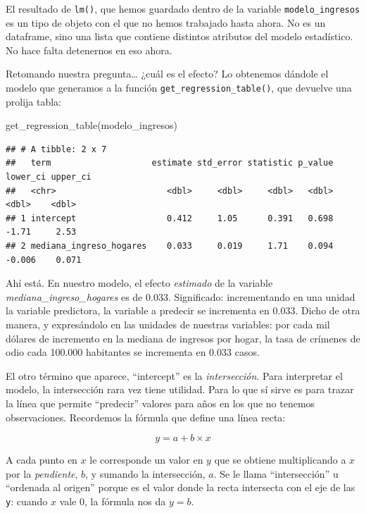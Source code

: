 \documentclass[
]{book}
\newenvironment{Shaded}{\begin{snugshade}}{\end{snugshade}}
\newcommand{\FunctionTok}[1]{\textcolor[rgb]{0.00,0.00,0.00}{#1}}
\newcommand{\NormalTok}[1]{#1}
\begin{document}
El resultado de \texttt{lm()}, que hemos guardado dentro de la variable \texttt{modelo\_ingresos} es un tipo de objeto con el que no hemos trabajado hasta ahora. No es un dataframe, sino una lista que contiene distintos atributos del modelo estadístico. No hace falta detenernos en eso ahora.

Retomando nuestra pregunta\ldots{} ¿cuál es el efecto? Lo obtenemos dándole el modelo que generamos a la función \texttt{get\_regression\_table()}, que devuelve una prolija tabla:

\begin{Shaded}
\begin{Highlighting}[]
\FunctionTok{get\_regression\_table}\NormalTok{(modelo\_ingresos)}
\end{Highlighting}
\end{Shaded}

\begin{verbatim}
## # A tibble: 2 x 7
##   term                    estimate std_error statistic p_value lower_ci upper_ci
##   <chr>                      <dbl>     <dbl>     <dbl>   <dbl>    <dbl>    <dbl>
## 1 intercept                  0.412     1.05      0.391   0.698   -1.71     2.53 
## 2 mediana_ingreso_hogares    0.033     0.019     1.71    0.094   -0.006    0.071
\end{verbatim}

Ahí está. En nuestro modelo, el efecto \emph{estimado} de la variable \emph{mediana\_ingreso\_hogares} es de 0.033. Significado: incrementando en una unidad la variable predictora, la variable a predecir se incrementa en 0.033. Dicho de otra manera, y expresándolo en las unidades de nuestras variables: por cada mil dólares de incremento en la mediana de ingresos por hogar, la tasa de crímenes de odio cada 100.000 habitantes se incrementa en 0.033 casos.

El otro término que aparece, ``intercept'' es la \emph{intersección}. Para interpretar el modelo, la intersección rara vez tiene utilidad. Para lo que sí sirve es para trazar la línea que permite ``predecir'' valores para años en los que no tenemos observaciones. Recordemos la fórmula que define una línea recta:

\[ y = a + b \times x \]

A cada punto en \(x\) le corresponde un valor en \(y\) que se obtiene multiplicando a \(x\) por la \emph{pendiente}, \(b\), y sumando la intersección, \(a\). Se le llama ``intersección'' u ``ordenada al origen'' porque es el valor donde la recta intersecta con el eje de las \texttt{y}: cuando \(x\) vale \(0\), la fórmula nos da \(y = b\).
\end{document}
